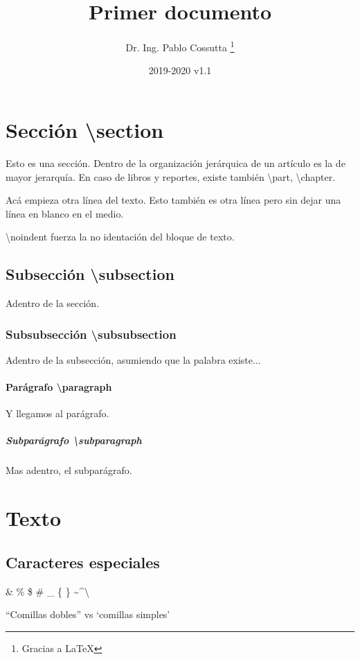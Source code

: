 \documentclass[11pt, a4paper]{article}
\title{Primer documento}
\author{Dr. Ing. Pablo Cossutta \thanks{Gracias a \LaTeX}}
\date{2019-2020 v1.1}
\begin{document}
\maketitle
\section{Sección \textbackslash section} \label{sec1}
Esto es una sección. Dentro de la organización jerárquica de un artículo es la de mayor jerarquía. En caso de libros y reportes, existe también \textbackslash part, \textbackslash chapter.

Acá empieza otra línea del texto.
Esto también es otra línea pero sin dejar una línea en blanco en el medio. 

\noindent \textbackslash noindent fuerza la no identación del bloque de texto.

\subsection{Subsección \textbackslash subsection}
Adentro de la sección. 

\subsubsection{Subsubsección \textbackslash subsubsection}
Adentro de la subsección, asumiendo que la palabra existe...

\paragraph{Parágrafo \textbackslash paragraph}
Y llegamos al parágrafo.
\subparagraph{Subparágrafo \textbackslash subparagraph}
Mas adentro, el subparágrafo.

\section{Texto}
\subsection{Caracteres especiales}
\& \% \$ \# \_ \{ \} \textasciitilde \textasciicircum \textbackslash

``Comillas dobles'' vs `comillas simples'
\end{document}
